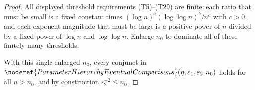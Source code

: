 \begin{proof}
All displayed threshold requirements (T5)--(T29) are finite: each ratio that
must be small is a fixed constant times
\((\log n)^a(\log\log n)^b/n^c\) with \(c>0\), and each exponent magnitude
that must be large is a positive power of \(n\) divided by a fixed power of
\(\log n\) and \(\log\log n\).  Enlarge \(n_0\) to dominate all of these
finitely many thresholds.

With this single enlarged \(n_0\), every conjunct in
\(\noderef{ParameterHierarchyEventualComparisons}(\eta,\varepsilon_1,
\varepsilon_2,n_0)\) holds for all \(n>n_0\), and by construction
\(\varepsilon_2^{-2}\le n_0\).
\end{proof}
